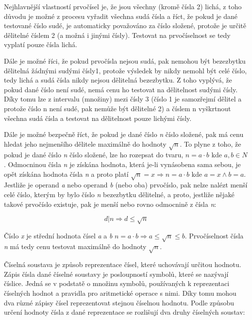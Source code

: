 Nejhlavnější vlastností prvočísel je, že jsou všechny (kromě čísla 2) lichá, z toho důvodu je možné z procesu vyřadit všechna sudá čísla a říct, že pokud je dané testované číslo sudé, je automaticky považováno za číslo složené, protože je určitě dělitelné číslem 2 (a možná i jinými čísly). Testovat na prvočíselnost se tedy vyplatí pouze čísla lichá.

Dále je možné říci, že pokud prvočísla nejsou sudá, pak nemohou být bezezbytku dělitelná žádnými sudými čísly1, protože výsledek by nikdy nemohl být celé číslo, tedy lichá a sudá čísla nikdy nejsou dělitelná bezezbytku. Z toho vyplývá, že pokud dané číslo není sudé, nemá cenu ho testovat na dělitelnost sudými čísly. Díky tomu lze z intervalu (množiny) mezi čísly 3 (číslo 1 je samozřejmí dělitel a protože číslo n není sudé, pak nemůže být dělitelné 2) a číslem n vyškrtnout všechna sudá čísla a testovat na dělitelnost pouze lichými čísly.

Dále je možné bezpečně říct, že pokud je dané číslo {\it n} číslo složené, pak má cenu hledat jeho nejmenšího dělitele maximálně do hodnoty $\sqrt{n}$. To plyne z toho, že pokud je dané číslo {\it n} číslo složené, lze ho rozepsat do tvaru, $n = a\cdot b$ kde $a,b \in N$. Odmocninou čísla {\it n} je získána hodnota, která je-li vynásobena sama sebou, je opět získána hodnota čísla {\it n} a proto platí $\sqrt{n} = x \Rightarrow n= a\cdot b$ kde $a=x \wedge b=a  $. Jestliže je operand {\it a} nebo operand {\it b} (nebo oba) prvočíslo, pak nelze nalézt menší celé číslo, kterým by bylo číslo {\it n} bezezbytku dělitelné, a proto, jestliže nějaké takové prvočíslo existuje, pak je menší nebo rovno odmocnině z čísla {\it n}:

$$ d | n \Rightarrow d \leq \sqrt{n} $$

Číslo {\it x} je střední hodnota čísel {\it a} a {\it b} $n = a\cdot b \Rightarrow a \leq \sqrt{n} \leq b$. Prvočíselnost čísla {\it n} má tedy cenu testovat maximálně do hodnoty $\sqrt{n}$.





Číselná soustava je způsob reprezentace čísel, které uchovávají určitou hodnotu. Zápis čísla dané číselné soustavy je posloupností symbolů, které se nazývají číslice. Jedná se v podstatě o množinu symbolů, používaných k reprezentaci číselných hodnot a pravidla pro aritmetické operace s nimi. Díky tomu mohou dva různé zápisy čísel reprezentovat stejnou číselnou hodnotu. Podle způsobu určení hodnoty čísla z dané reprezentace se rozlišují dva druhy číselných soustav:

